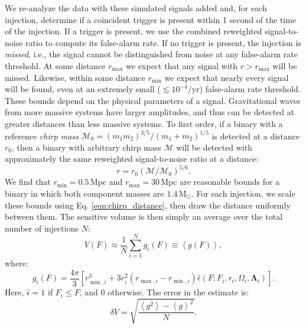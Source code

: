 \documentclass[12pt]{iopart} \usepackage{graphicx,amssymb}
\begin{document}
We re-analyze the data with these simulated signals added and,
for each injection, determine if a coincident trigger is present within 1
second of the time of the injection. If a trigger is present, we use the
combined reweighted signal-to-noise ratio to compute its false-alarm rate. 
If no trigger is present, the injection is
\emph{missed}, i.e., the signal cannot be distinguished from noise at any
false-alarm rate
threshold. At some distance $r_{\max}$ we expect that any signal with $r >
r_{\max}$ will be missed.  Likewise, within some distance $r_{\min}$ we expect
that nearly every signal will be
found, even at an extremely small ($\lesssim 10^{-4} / \mathrm{yr}$)
false-alarm rate
threshold. These bounds depend on the physical parameters of a signal.
Gravitational waves from more massive systems have larger amplitudes, and thus
can be detected at greater distances than less massive systems. To first order,
if a binary with a reference \emph{chirp mass} $\mathcal{M}_0 = (m_1
m_2)^{3/5}/(m_1 + m_2)^{1/5}$ is detected at a distance $r_0$, then a binary
with arbitrary chirp mass $\mathcal{M}$ will be detected with approximately the
same reweighted signal-to-noise ratio at a distance:
\begin{equation}
r = r_{0}(\mathcal{M}/\mathcal{M}_{0})^{5/6}.
\label{eqn:chirp_distance}
\end{equation}
We find that $r_{\min} = 0.5\,$Mpc and $r_{\max} = 30\,$Mpc are reasonable
bounds for a binary in which both component masses are $1.4\,\mathrm{M}_\odot$.
For each injection, we scale these bounds using Eq. \eqref{eqn:chirp_distance},
then draw the distance uniformly between them. The sensitive volume
is then simply an average over the total number of injections $N$:
\begin{equation}
V(F) \approx \frac{1}{N} \sum_{i=1}^N g_i(F) \equiv \left<g(F)\right>,
\end{equation}
where:
\begin{equation}
g_i(F) = \frac{4\pi}{3} \left[ r_{\min,i}^3 + 3r_i^2(r_{\max,i}-r_{\min,i})\hat{\epsilon}(F; F_i, r_i, \Omega_i, \mathbf{\Lambda}_i)\right].
\end{equation}
Here, $\hat{\epsilon} = 1$ if $F_i \leq F$, and
$0$ otherwise. The error in the estimate is:%
\begin{equation}
\delta V = \sqrt{\frac{\left<g^2\right> - \left<g\right>^2}{N}}.
\end{equation}
\end{document}
